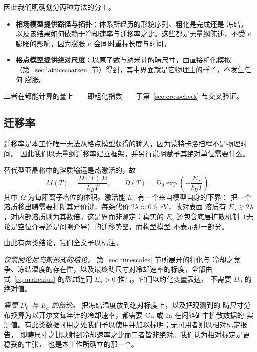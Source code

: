 \documentclass[11pt,a4paper]{ctexart}
\begin{document}
因此我们明确划分两种方法的分工。

\begin{itemize}\itemsep2pt
\item \textbf{相场模型提供路径与拓扑}：体系所经历的形貌序列、粗化是完成还是
冻结，以及该结果如何依赖于冷却速率与迁移率之比。这些都是无量纲陈述，不受
$\kappa$ 膨胀的影响，因为膨胀 $\kappa$ 会同时重标长度与时间。
\item \textbf{格点模型提供绝对尺度}：以原子数与纳米计的畴尺寸，由直接粗化模拟
（第~\ref{sec:latticecoarsen} 节）得到，其中界面就是它物理上的样子，不发生任何
膨胀。
\end{itemize}

二者在都能计算的量上——即粗化指数——于第~\ref{sec:crosscheck} 节交叉验证。

\subsection{迁移率}
\label{sec:mobility}

迁移率是本工作唯一无法从格点模型获得的输入，因为蒙特卡洛扫程不是物理时间。
因此我们以无量纲迁移率建立框架，并另行说明赋予其绝对单位需要什么。

替代型亚晶格中的溶质输运是热激活的，故
\begin{equation}
M(T) = \frac{D(T)\, \Omega}{k_B T}, \qquad
D(T) = D_0 \exp\!\left(-\frac{E_a}{k_B T}\right),
\label{eq:arrhenius}
\end{equation}
其中 $\Omega$ 为每阳离子格位的体积。激活能 $E_a$ 有一个来自模型自身的下界：
把一个溶质移出畴需要打断其异价键，每条代价 $2\lambda \approx 0.6$~eV，故对表面
溶质有 $E_a \gtrsim 2\lambda$，对内部溶质则为其数倍。这是界而非测定：真实的
$E_a$ 还包含底层扩散机制（无论是空位介导还是间隙介导）的迁移势垒，而构型模型
不表示那一部分。

由此有两类结论，我们全文予以标注。

\emph{仅需阿伦尼乌斯形式的结论。} 第~\ref{sec:timescales} 节所展开的粗化与
冷却之竞争、冻结温度的存在性，以及最终畴尺寸对冷却速率的标度，全部由
式~\eqref{eq:arrhenius} 的\emph{形式}连同 $E_a > 0$ 推出。它们以约化变量表达，
不需要 $D_0$ 的绝对值。

\emph{需要 $D_0$ 与 $E_a$ 的结论。} 把冻结温度放到绝对标度上，以及把观测到的
畴尺寸分布换算为以开尔文每年计的冷却速率，都需要 Cu 或 In 在闪锌矿中扩散数据的
实测值。有此类数据可用之处我们予以使用并加以标明；无可用者则以相对标定报告，
即畴尺寸之比映射到冷却速率之比而二者皆非绝对。我们认为相对标定是更稳妥的主张，
也是本工作所确立的那一个。
\end{document}
